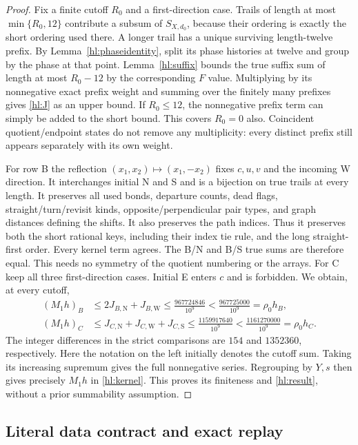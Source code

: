\begin{proof}
Fix a finite cutoff $R_0$ and a first-direction case.  Trails of
length at most $\min\{R_0,12\}$ contribute a subsum of
$S_{X,d_0}$, because their ordering is exactly the short
ordering used there.  A longer trail has a unique surviving
length-twelve prefix.  By Lemma~\ref{hl:phaseidentity}, split
its phase histories at twelve and group by the phase at that
point.  Lemma~\ref{hl:suffix} bounds the true suffix sum of
length at most $R_0-12$ by the corresponding $F$ value.
Multiplying by its nonnegative exact prefix weight and summing
over the finitely many prefixes gives \eqref{hl:J} as an upper
bound.  If $R_0\le12$, the nonnegative prefix term can simply
be added to the short bound.  This covers $R_0=0$ also.
Coincident quotient/endpoint states do not remove any
multiplicity: every distinct prefix still appears separately
with its own weight.

For row B the reflection $(x_1,x_2)\mapsto(x_1,-x_2)$ fixes
$c,u,v$ and the incoming W direction.  It interchanges initial
N and S and is a bijection on true trails at every length.
It preserves all used bonds, departure counts, dead flags,
straight/turn/revisit kinds, opposite/perpendicular pair types,
and graph distances defining the shifts.  It also preserves
the path indices.  Thus it preserves both the short rational
keys, including their index tie rule, and the long
straight-first order.  Every kernel term agrees.  The B/N
and B/S true sums are therefore equal.  This needs no symmetry
of the quotient numbering or the arrays.  For C keep all
three first-direction cases.  Initial E enters $c$ and is
forbidden.  We obtain, at every cutoff,
\begin{align*}
 (M_1h)_B&\le2J_{B,\mathrm N}+J_{B,\mathrm W}
 \le\frac{967724846}{10^9}
 <\frac{967725000}{10^9}=\rho_0h_B,\\
 (M_1h)_C&\le J_{C,\mathrm N}+J_{C,\mathrm W}+J_{C,\mathrm S}
 \le\frac{1159917640}{10^9}
 <\frac{1161270000}{10^9}=\rho_0h_C.
\end{align*}
The integer differences in the strict comparisons are $154$
and $1352360$, respectively.  Here the notation on the left
initially denotes the cutoff sum.  Taking its increasing
supremum gives the full nonnegative series.  Regrouping by
$Y,s$ then gives precisely $M_1h$ in \eqref{hl:kernel}.
This proves its finiteness and \eqref{hl:result}, without a
prior summability assumption.
\end{proof}

\subsection{Literal data contract and exact replay}


